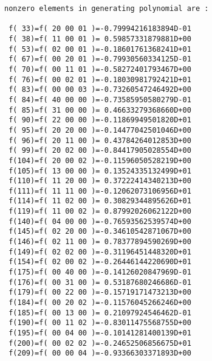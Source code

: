 \begin{footnotesize}
\begin{verbatim}
nonzero elements in generating polynomial are :

 f( 33)=f( 20 00 01 )=-0.79994216183894D-01
 f( 38)=f( 11 00 01 )= 0.59857331879881D+00
 f( 53)=f( 02 00 01 )=-0.18601761368241D+01
 f( 67)=f( 00 20 01 )=-0.79930560334125D-01
 f( 70)=f( 00 11 01 )=-0.58272401793467D+00
 f( 76)=f( 00 02 01 )=-0.18030981792421D+01
 f( 83)=f( 00 00 03 )=-0.73260547246492D+00
 f( 84)=f( 40 00 00 )=-0.73585950580279D-01
 f( 85)=f( 31 00 00 )= 0.46633279368660D+00
 f( 90)=f( 22 00 00 )=-0.11869949501820D+01
 f( 95)=f( 20 20 00 )=-0.14477042501046D+00
 f( 96)=f( 20 11 00 )= 0.43784264012853D+00
 f( 99)=f( 20 02 00 )=-0.84417905028554D+00
 f(104)=f( 20 00 02 )=-0.11596050528219D+00
 f(105)=f( 13 00 00 )= 0.13524335132499D+01
 f(110)=f( 11 20 00 )= 0.37222414340213D+00
 f(111)=f( 11 11 00 )=-0.12062073106956D+01
 f(114)=f( 11 02 00 )= 0.30829344895626D+01
 f(119)=f( 11 00 02 )= 0.87992026062122D+00
 f(140)=f( 04 00 00 )=-0.76593562539574D+00
 f(145)=f( 02 20 00 )=-0.34610542871067D+00
 f(146)=f( 02 11 00 )= 0.78377894590269D+00
 f(149)=f( 02 02 00 )=-0.31196451448320D+01
 f(154)=f( 02 00 02 )=-0.26446144220690D+01
 f(175)=f( 00 40 00 )=-0.14126020847969D-01
 f(176)=f( 00 31 00 )= 0.53187680246686D-01
 f(179)=f( 00 22 00 )=-0.15719171473213D+00
 f(184)=f( 00 20 02 )=-0.11576045266246D+00
 f(185)=f( 00 13 00 )= 0.21097924546462D-01
 f(190)=f( 00 11 02 )=-0.83011475568755D+00
 f(195)=f( 00 04 00 )=-0.10141281400139D+01
 f(200)=f( 00 02 02 )=-0.24652506856675D+01
 f(209)=f( 00 00 04 )=-0.93366303371893D+00
\end{verbatim}
\end{footnotesize}
\newpage
